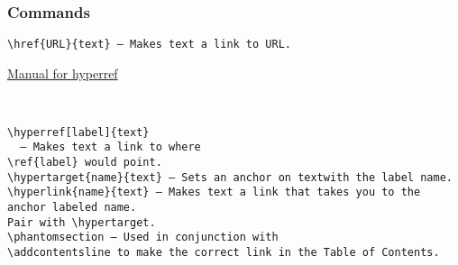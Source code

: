 \documentclass{report}
\begin{document}
\subsubsection{\Large Commands}
\begin{verbatim}
\href{URL}{text} — Makes text a link to URL.
\end{verbatim}
\href{../../../../../documentation/references/hyperrefmanual.pdf}{Manual for hyperref}

\begin{verbatim}


\hyperref[label]{text} 
  — Makes text a link to where
\ref{label} would point.
\hypertarget{name}{text} — Sets an anchor on textwith the label name. 
\hyperlink{name}{text} — Makes text a link that takes you to the anchor labeled name. 
Pair with \hypertarget. 
\phantomsection — Used in conjunction with
\addcontentsline to make the correct link in the Table of Contents.
\end{verbatim}				
\end{document}
